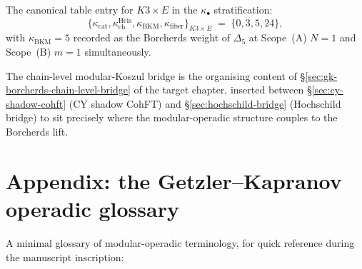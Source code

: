The canonical table entry for $K3 \times E$ in the $\kappa_\bullet$
stratification:
\[
 \{\kappa_{\mathrm{cat}}, \kappa_{\mathrm{ch}}^{\mathrm{Heis}},
 \kappa_{\mathrm{BKM}}, \kappa_{\mathrm{fiber}}\}_{K3 \times E}
 \;=\; \{0, 3, 5, 24\},
\]
with $\kappa_{\mathrm{BKM}} = 5$ recorded as the Borcherds weight of
$\Delta_5$ at Scope~(A) $N = 1$ and Scope~(B) $m = 1$ simultaneously.

The chain-level modular-Koszul bridge is the organising content of
\S\ref{sec:gk-borcherds-chain-level-bridge} of the target chapter,
inserted between \S\ref{sec:cy-shadow-cohft} (CY shadow CohFT) and
\S\ref{sec:hochschild-bridge} (Hochschild bridge) to sit precisely where
the modular-operadic structure couples to the Borcherds lift.


\section{Appendix: the Getzler--Kapranov operadic glossary}
\label{sec:appendix-gk-glossary}

A minimal glossary of modular-operadic terminology, for quick reference
during the manuscript inscription:

